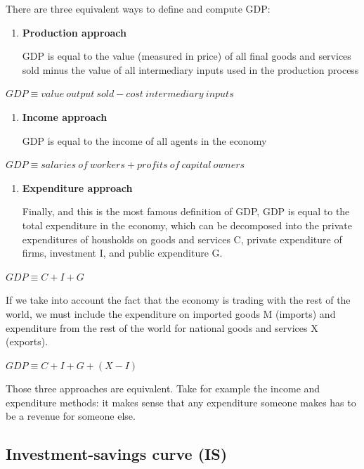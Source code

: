 \documentclass[
  letterpaper,
  DIV=11,
  numbers=noendperiod]{scrreprt}
\begin{document}
There are three equivalent ways to define and compute GDP:

\begin{enumerate}
\def\labelenumi{\arabic{enumi}.}
\item
  \textbf{Production approach}

  GDP is equal to the value (measured in price) of all final goods and
  services sold minus the value of all intermediary inputs used in the
  production process
\end{enumerate}

\(GDP \equiv value\: output\: sold - cost\: intermediary\: inputs\)

\begin{enumerate}
\def\labelenumi{\arabic{enumi}.}
\setcounter{enumi}{1}
\item
  \textbf{Income approach}

  GDP is equal to the income of all agents in the economy
\end{enumerate}

\(GDP \equiv salaries\:of\:workers + profits\:of\:capital\:owners\)

\begin{enumerate}
\def\labelenumi{\arabic{enumi}.}
\setcounter{enumi}{2}
\item
  \textbf{Expenditure approach}

  Finally, and this is the most famous definition of GDP, GDP is equal
  to the total expenditure in the economy, which can be decomposed into
  the private expenditures of housholds on goods and services C, private
  expenditure of firms, investment I, and public expenditure G.
\end{enumerate}

\(GDP \equiv C + I + G\)

If we take into account the fact that the economy is trading with the
rest of the world, we must include the expenditure on imported goods M
(imports) and expenditure from the rest of the world for national goods
and services X (exports).

\(GDP \equiv C + I + G + (X-I)\)

Those three approaches are equivalent. Take for example the income and
expenditure methods: it makes sense that any expenditure someone makes
has to be a revenue for someone else.

\hypertarget{investment-savings-curve-is}{%
\subsection{Investment-savings curve
(IS)}\label{investment-savings-curve-is}}
\end{document}
